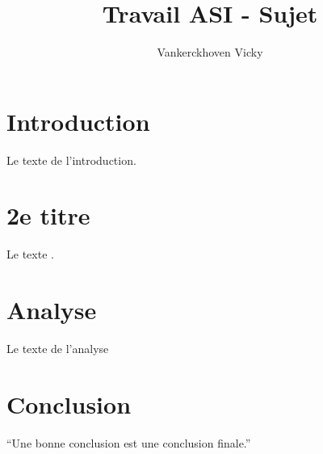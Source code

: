 \documentclass[a4paper,11pt]{article} %
\title{Travail ASI - Sujet} %
\author{Vankerckhoven Vicky} %
\date{} %
\begin{document}
\maketitle %

\section{Introduction} %
Le texte de l'introduction. %

\section{2e titre} %
Le texte . %

\section{Analyse} %
Le texte de l'analyse

\section{Conclusion} %
\enquote{Une bonne conclusion est une conclusion finale.} \citep{Hoo12} %

\end{document}
